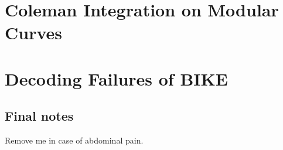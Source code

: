 \documentclass[12pt,chapterheads]{ucsd}
\theoremstyle{definition}
\begin{document}
%







%   
%   
%


\part{Coleman Integration on Modular Curves}










\part{Decoding Failures of BIKE}


\appendix
\chapter{Final notes}
  Remove me in case of abdominal pain.



\singlespace  %
\end{document}
